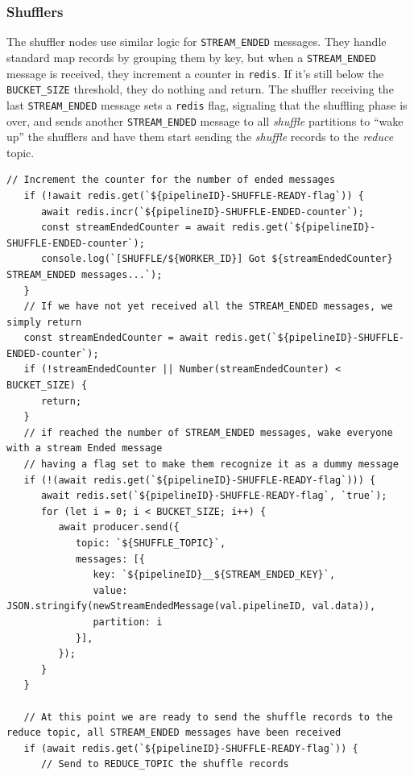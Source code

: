 \subsubsection{Shufflers}
The shuffler nodes use similar logic for \lstinline|STREAM_ENDED| messages. 
They handle standard map records by grouping them by key, but when a \lstinline|STREAM_ENDED| message is received, they increment a counter in \texttt{redis}. If it's still below the \lstinline|BUCKET_SIZE| threshold, they do nothing and return.
The shuffler receiving the last \lstinline|STREAM_ENDED| message sets a \texttt{redis} flag, signaling that the shuffling phase is over, and sends another \lstinline|STREAM_ENDED| message to all \textit{shuffle} partitions to ``wake up'' the shufflers and have them start sending the \textit{shuffle} records to the \textit{reduce} topic.

\begin{lstlisting}[label={lst:streamEndedShuffler}, caption={Handling the STREAM\_ENDED message in a shuffler},captionpos={top}]
   // Increment the counter for the number of ended messages
   if (!await redis.get(`${pipelineID}-SHUFFLE-READY-flag`)) {
      await redis.incr(`${pipelineID}-SHUFFLE-ENDED-counter`);
      const streamEndedCounter = await redis.get(`${pipelineID}-SHUFFLE-ENDED-counter`);
      console.log(`[SHUFFLE/${WORKER_ID}] Got ${streamEndedCounter} STREAM_ENDED messages...`);
   }
   // If we have not yet received all the STREAM_ENDED messages, we simply return
   const streamEndedCounter = await redis.get(`${pipelineID}-SHUFFLE-ENDED-counter`);
   if (!streamEndedCounter || Number(streamEndedCounter) < BUCKET_SIZE) {
      return;
   }
   // if reached the number of STREAM_ENDED messages, wake everyone with a stream Ended message 
   // having a flag set to make them recognize it as a dummy message
   if (!(await redis.get(`${pipelineID}-SHUFFLE-READY-flag`))) {
      await redis.set(`${pipelineID}-SHUFFLE-READY-flag`, `true`);
      for (let i = 0; i < BUCKET_SIZE; i++) {
         await producer.send({
            topic: `${SHUFFLE_TOPIC}`,
            messages: [{
               key: `${pipelineID}__${STREAM_ENDED_KEY}`,
               value: JSON.stringify(newStreamEndedMessage(val.pipelineID, val.data)),
               partition: i
            }],
         });
      }
   }
  
   // At this point we are ready to send the shuffle records to the reduce topic, all STREAM_ENDED messages have been received
   if (await redis.get(`${pipelineID}-SHUFFLE-READY-flag`)) {
      // Send to REDUCE_TOPIC the shuffle records
\end{lstlisting}

